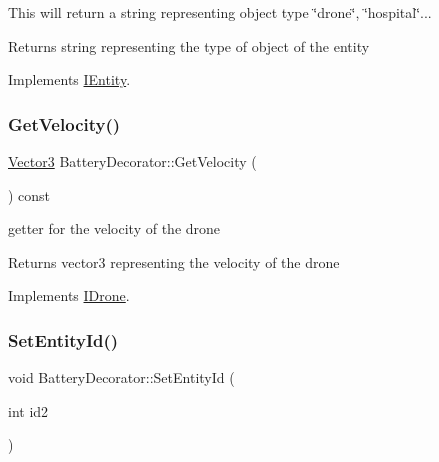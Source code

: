 This will return a string representing object type \char`\"{}drone\char`\"{}, \char`\"{}hospital\char`\"{}... 

\begin{DoxyReturn}{Returns}
string representing the type of object of the entity 
\end{DoxyReturn}


Implements \hyperlink{classIEntity_ac494bb9712d5a03495a1a95afdbd7153}{I\+Entity}.

\mbox{\label{classBatteryDecorator_a978565b772172669437ffec923349f32}} 
\subsubsection{\texorpdfstring{Get\+Velocity()}{GetVelocity()}}
{\footnotesize\ttfamily \hyperlink{classVector3}{Vector3} Battery\+Decorator\+::\+Get\+Velocity (\begin{DoxyParamCaption}{ }\end{DoxyParamCaption}) const\hspace{0.3cm}{\ttfamily [virtual]}}



getter for the velocity of the drone 

\begin{DoxyReturn}{Returns}
vector3 representing the velocity of the drone 
\end{DoxyReturn}


Implements \hyperlink{classIDrone_abad6c0adb60d6deceb13f30687fed57b}{I\+Drone}.

\mbox{\label{classBatteryDecorator_a59bc5191357fdeb9a52ee6121d79b12d}} 
\subsubsection{\texorpdfstring{Set\+Entity\+Id()}{SetEntityId()}}
{\footnotesize\ttfamily void Battery\+Decorator\+::\+Set\+Entity\+Id (\begin{DoxyParamCaption}\item[{int}]{id2 }\end{DoxyParamCaption})\hspace{0.3cm}{\ttfamily [virtual]}}



